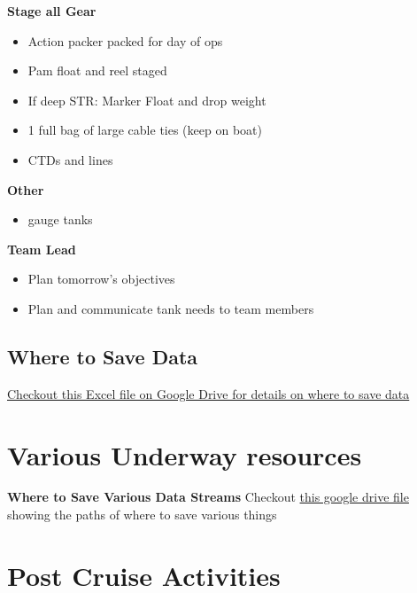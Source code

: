 \documentclass[]{book}
\providecommand{\tightlist}{%
  \setlength{\itemsep}{0pt}\setlength{\parskip}{0pt}}
\begin{document}
\textbf{Stage all Gear}

\begin{itemize}
\tightlist
\item
  Action packer packed for day of ops
\item
  Pam float and reel staged
\item
  If deep STR: Marker Float and drop weight
\item
  1 full bag of large cable ties (keep on boat)
\item
  CTDs and lines
\end{itemize}

\textbf{Other}

\begin{itemize}
\tightlist
\item
  gauge tanks
\end{itemize}

\textbf{Team Lead}

\begin{itemize}
\tightlist
\item
  Plan tomorrow's objectives
\item
  Plan and communicate tank needs to team members
\end{itemize}

\hypertarget{where-to-save-data}{%
\section{Where to Save Data}\label{where-to-save-data}}

\href{https://drive.google.com/open?id=16l1OQgGEunLoADh_MEGyIfbQL2w0u6aw}{Checkout this Excel file on Google Drive for details on where to save data}

\hypertarget{various-underway-resources}{%
\chapter{Various Underway resources}\label{various-underway-resources}}

\textbf{Where to Save Various Data Streams}
Checkout \href{https://docs.google.com/spreadsheets/d/16l1OQgGEunLoADh_MEGyIfbQL2w0u6aw/edit\#gid=1675337307}{this google drive file} showing the paths of where to save various things

\hypertarget{postcruise}{%
\chapter{Post Cruise Activities}\label{postcruise}}
\end{document}
